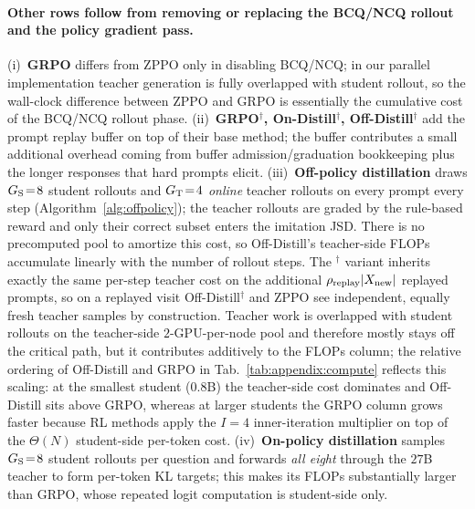 \paragraph{Other rows follow from removing or replacing the BCQ/NCQ rollout and the policy gradient pass.} (i)~\textbf{GRPO} differs from ZPPO only in disabling BCQ/NCQ; in our parallel implementation teacher generation is fully overlapped with student rollout, so the wall-clock difference between ZPPO and GRPO is essentially the cumulative cost of the BCQ/NCQ rollout phase. (ii)~\textbf{GRPO$^{\dagger}$, On-Distill$^{\dagger}$, Off-Distill$^{\dagger}$} add the prompt replay buffer on top of their base method; the buffer contributes a small additional overhead coming from buffer admission/graduation bookkeeping plus the longer responses that hard prompts elicit. (iii)~\textbf{Off-policy distillation} draws $G_{\rm S}\!=\!8$ student rollouts and $G_{\rm T}\!=\!4$ \emph{online} teacher rollouts on every prompt every step (Algorithm~\ref{alg:offpolicy}); the teacher rollouts are graded by the rule-based reward and only their correct subset enters the imitation JSD. There is no precomputed pool to amortize this cost, so Off-Distill's teacher-side FLOPs accumulate linearly with the number of rollout steps. The $^{\dagger}$ variant inherits exactly the same per-step teacher cost on the additional $\rho_{\rm replay}|X_{\rm new}|$ replayed prompts, so on a replayed visit Off-Distill$^{\dagger}$ and ZPPO see independent, equally fresh teacher samples by construction. Teacher work is overlapped with student rollouts on the teacher-side $2$-GPU-per-node pool and therefore mostly stays off the critical path, but it contributes additively to the FLOPs column; the relative ordering of Off-Distill and GRPO in Tab.~\ref{tab:appendix:compute} reflects this scaling: at the smallest student ($0.8$B) the teacher-side cost dominates and Off-Distill sits above GRPO, whereas at larger students the GRPO column grows faster because RL methods apply the $I\!=\!4$ inner-iteration multiplier on top of the $\Theta(N)$ student-side per-token cost. (iv)~\textbf{On-policy distillation} samples $G_{\rm S}\!=\!8$ student rollouts per question and forwards \emph{all eight} through the $27$B teacher to form per-token KL targets; this makes its FLOPs substantially larger than GRPO, whose repeated logit computation is student-side only.